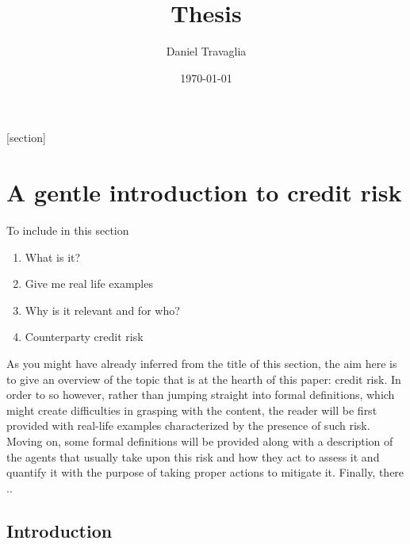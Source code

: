 \documentclass[a4paper,12pt]{article}
\begin{document}
    [section]
    \newenvironment{definition}[1][]{\refstepcounter{definition}\par\medskip
        \noindent \textbf{Definition #1:} \rmfamily}{\medskip}
    
    \title{Thesis}
    \author{Daniel Travaglia}
    \date{\today}
    \maketitle

    \pagebreak

    \pagebreak
    
    \section{A gentle introduction to credit risk}

    To include in this section
    \begin{enumerate}
        \item What is it?
        \item Give me real life examples
        \item Why is it relevant and for who?
        \item Counterparty credit risk
    \end{enumerate}

    As you might have already inferred from the title of this section, the aim here is to give an overview
    of the topic that is at the hearth of this paper: credit risk. In order to so however, rather than jumping 
    straight into formal definitions, which might create difficulties in grasping with the content, the reader 
    will be first provided with real-life examples characterized by the presence of such risk. Moving on, some
    formal definitions will be provided along with a description of the agents that usually take upon this risk 
    and how they act to assess it and quantify it with the purpose of taking proper actions to mitigate it. Finally, there ..

    \subsection[]{Introduction}
            
\end{document}
